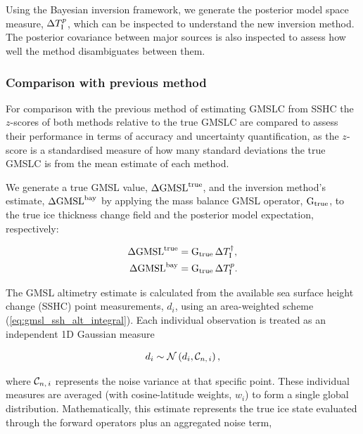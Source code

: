 Using the Bayesian inversion framework, we generate the posterior model space measure, $\Delta T_\text{I}^{p}$, which can be inspected to understand the new inversion method. The posterior covariance between major sources is also inspected to assess how well the method disambiguates between them.

\subsubsection{Comparison with previous method}

For comparison with the previous method of estimating GMSLC from SSHC the $z$-scores of both methods relative to the true GMSLC are compared to assess their performance in terms of accuracy and uncertainty quantification, as the $z$-score is a standardised measure of how many standard deviations the true GMSLC is from the mean estimate of each method.

We generate a true GMSL value, $\Delta \mathrm{GMSL}^{\mathrm{true}}$, and the inversion method's estimate, $\Delta \mathrm{GMSL}^{\mathrm{bay}}$ by applying the mass balance GMSL operator, $\operatorname{{G}}_{{\text{true}}}$, to the true ice thickness change field and the posterior model expectation, respectively:

\begin{align}
	\Delta \mathrm{GMSL}^{\mathrm{true}} &= \operatorname{{G}}_{{\text{true}}} \Delta T_\text{I}^\dagger, \label{eq:true-gmsl-model} \\
	\Delta \mathrm{GMSL}^{\mathrm{bay}} &= \operatorname{{G}}_{{\text{true}}} \Delta T_\text{I}^{p}. \label{eq:bay-gmsl-model}
\end{align}


The GMSL altimetry estimate is calculated from the available sea surface height change (SSHC) point measurements, $d_i$, using an area-weighted scheme (\autoref{eq:gmsl_ssh_alt_integral}). Each individual observation is treated as an independent 1D Gaussian measure

\begin{equation}
  d_i \sim \mathcal{N}\left(d_i, \mathcal{C}_{n,\,i}\right),
\end{equation}

where $\mathcal{C}_{n,\,i}$ represents the noise variance at that specific point. These individual measures are averaged (with cosine-latitude weights, $w_i$) to form a single global distribution. Mathematically, this estimate represents the true ice state evaluated through the forward operators plus an aggregated noise term,

